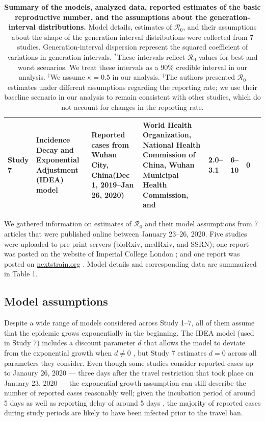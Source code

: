 \documentclass[12pt]{article}
\newcommand{\Ro}{\ensuremath{{\mathcal R}_{0}}\xspace}
\begin{document}
{\begin{landscape}
\begin{table}[!th]
\begin{center}
\begin{tabular}{l|p{2cm}|p{3.2cm}|p{2.8cm}|p{2.5cm}|p{2.4cm}|p{2.7cm}|p{2cm}}
\hline
Study 7 & Incidence Decay and Exponential Adjustment (IDEA) model & Reported cases from Wuhan City, China\newline (Dec 1, 2019--Jan 26, 2020) & World	Health Organization, National Health Commission of China, Wuhan Municipal	Health Commission, and \cite{huang2020clinical} & 2.0--3.1 & 6--10 & 0 & \cite{majumderncov} \\
\hline
\end{tabular}
\end{center}
\caption{
\textbf{Summary of the models, analyzed data, reported estimates of the basic reproductive number, and the assumptions about the generation-interval distributions.}
Model details, estimates of \Ro, and their assumptions about the shape of the generation interval distributions were collected from 7 studies.
Generation-interval dispersion represent the squared coefficient of variations in generation intervals.
$^\ast$These intervals reflect \Ro values for best and worst scenarios. We treat these intervals as a 90\% credible interval in our analysis.
$^\dagger$We assume $\kappa = 0.5$ in our analysis.
$^\ddagger$The authors presented \Ro estimates under different assumptions regarding the reporting rate; we use their baseline scenario in our analysis to remain consistent with other studies, which do not account for changes in the reporting rate.
}
\end{table}
\end{landscape}
\clearpage
}

We gathered information on estimates of \Ro and their model assumptions from 7 articles that were published online between January 23--26, 2020.
Five studies \citep{liuncov, majumderncov, readncov, riouncov, zhaoncov} were uploaded to pre-print servers (bioRxiv, medRxiv, and SSRN); one report was posted on the website of Imperial College London \citep{imaincov}; and one report was posted on \url{nextstrain.org} \citep{bedfordncov}.
Model details and corresponding data are summarized in Table 1.

\subsection{Model assumptions}

Despite a wide range of models considered across Study 1--7, all of them assume that the epidemic grows exponentially in the beginning.
The IDEA model (used in Study 7) includes a discount parameter $d$ that allows the model to deviate from the exponential growth when $d \neq 0$ \citep{fisman2013idea}, but Study 7 estimates $d=0$ across all parameters they consider.
Even though some studies consider reported cases up to Janaury 26, 2020 --- three days after the travel restriction that took place on January 23, 2020 \citep{Tianeabb6105} --- the exponential growth assumption can still describe the number of reported cases reasonably well;
given the incubation period of around 5 days \citep{lauer2020incubation} as well as reporting delay of around 5 days \citep{sun2020early}, the majority of reported cases during study periods are likely to have been infected prior to the travel ban.
\end{document}
